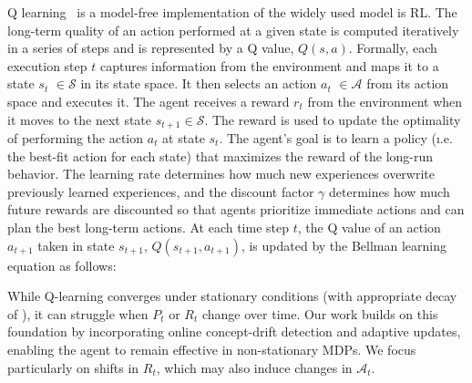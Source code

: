 Q learning~\cite{watkins92} is a model-free implementation of the widely used model
is \ac{RL}. The long-term quality of an action performed at a given state is computed iteratively in a series of steps and is represented by a Q value,
$\mathit{Q(s,a)}$.
Formally, each execution step $t$ captures information from the environment and maps it to a state
{\color{purple}$s_t$} $\in \mathcal{S}$ in its state space. It then selects an
action {\color{purple}$a_t$} $\in \mathcal{A}$ from its action space and executes it. The agent
receives a reward {\color{Bittersweet}$r_t$} from the environment when it moves to the next state
$s_{t+1} \in \mathcal{S}$. The reward is used to update the optimality of performing the
action {\color{Mulberry}$a_t$} at state {\color{purple}$s_t$}. The agent's goal is to learn
a policy (\i.e. the best-fit action for each state) that maximizes the reward of the
long-run behavior. The learning rate \lrate{\alpha} determines how much new experiences 
overwrite previously learned experiences, and the discount factor {\color{RoyalBlue} $\gamma$} 
determines how much future rewards are discounted so that agents prioritize immediate actions and 
can plan the best long-term actions. At each time step $t$, the Q value of an action 
{\color{purple}$a_{t+1}$} taken in state {\color{purple}$s_{t+1}$}, $Q(s_{t+1}, a_{t+1})$, is updated by 
the Bellman learning equation as follows:

\vspace{1em}


While Q-learning converges under stationary conditions (with appropriate decay of \lrate{\alpha}), it can struggle when $P_t$ or $R_t$ change over time. Our work builds on this foundation by incorporating online concept-drift detection and adaptive updates, enabling the agent to remain effective in non-stationary MDPs. We focus particularly on shifts in $R_t$, which may also induce changes in $\mathcal{A}_t$.


\endinput

